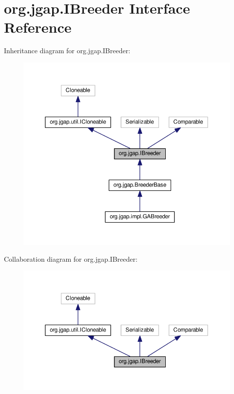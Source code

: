 \hypertarget{interfaceorg_1_1jgap_1_1_i_breeder}{\section{org.\-jgap.\-I\-Breeder Interface Reference}
\label{interfaceorg_1_1jgap_1_1_i_breeder}
}


Inheritance diagram for org.\-jgap.\-I\-Breeder\-:
\nopagebreak
\begin{figure}[H]
\begin{center}
\leavevmode
\includegraphics[width=350pt]{interfaceorg_1_1jgap_1_1_i_breeder__inherit__graph}
\end{center}
\end{figure}


Collaboration diagram for org.\-jgap.\-I\-Breeder\-:
\nopagebreak
\begin{figure}[H]
\begin{center}
\leavevmode
\includegraphics[width=350pt]{interfaceorg_1_1jgap_1_1_i_breeder__coll__graph}
\end{center}
\end{figure}
